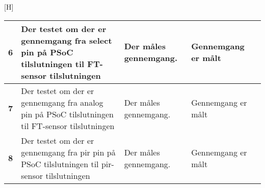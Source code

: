 \begin{center}[H]
\begin{longtable}{|p{}|p{}|p{}|p{}|p{}|}
\textbf{6}	&Der testet om der er gennemgang fra select pin på PSoC tilslutningen til FT-sensor tilslutningen
			&Der måles gennemgang.
			& Gennemgang er målt
			& \\ \hline 
			
\textbf{7}	&Der testet om der er gennemgang fra analog pin på PSoC tilslutningen til FT-sensor tilslutningen
			&Der måles gennemgang.
			& Gennemgang er målt
			& \\ \hline 
			
\textbf{8}	&Der testet om der er gennemgang fra pir pin på PSoC tilslutningen til pir-sensor tilslutningen
			&Der måles gennemgang.
			& Gennemgang er målt
			& \\ \hline 
			

			
		
			
			
\end{longtable}
	\label{lab:modultest_tilslutningsprint} 
\end{center}